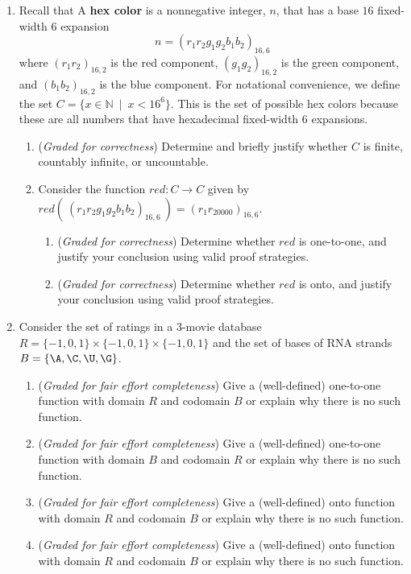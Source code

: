 \begin{enumerate}
   \item Recall that  A {\bf hex color} is a nonnegative
   integer, $n$, that has a base $16$ fixed-width $6$ expansion
   $$n = (r_1r_2g_1g_2b_1b_2)_{16,6}$$ 
   where $(r_1r_2)_{16,2}$ is the red
   component, $(g_1g_2)_{16,2}$ is the green component, and $(b_1b_2)_{16,2}$ is the
   blue component.   For notational convenience, we define the set 
   $C = \{ x \in \mathbb{N} ~\mid~x  < 16^6 \}$.  This is the set of possible hex colors because these
   are all numbers that have hexadecimal fixed-width $6$ expansions. 
   \begin{enumerate}
    \item ({\it Graded for correctness}) Determine and briefly justify whether $C$ is finite, countably infinite, or uncountable.
    \item Consider the function $red: C \to C$ given by $red(~(r_1r_2g_1g_2b_1b_2)_{16,6}~) = (r_1r_20000)_{16,6}$.
        \begin{enumerate}
            \item ({\it Graded for correctness}) Determine whether $red$ is one-to-one, 
            and justify your conclusion using valid proof strategies.
            \item ({\it Graded for correctness}) Determine whether $red$ is onto, 
            and justify your conclusion using valid proof strategies.
        \end{enumerate}
   \end{enumerate}

    \item Consider the set of ratings in a 3-movie database 
    $R = \{ -1,0,1\} \times \{-1,0,1\} \times \{-1,0,1\}$ and the set of 
    bases of RNA strands $B = \{\A, \C, \U, \G\}$.
    \begin{enumerate}
        \item ({\it Graded for fair effort completeness}) Give a (well-defined) one-to-one function with domain $R$ and codomain $B$ or explain why there is no such function.
        \item ({\it Graded for fair effort completeness}) Give a (well-defined) one-to-one function with domain $B$ and codomain $R$ or explain why there is no such function.
        \item ({\it Graded for fair effort completeness}) Give a (well-defined) onto function with domain $R$ and codomain $B$ or explain why there is no such function.
        \item ({\it Graded for fair effort completeness}) Give a (well-defined) onto function with domain $R$ and codomain $B$ or explain why there is no such function.
    \end{enumerate}


\end{enumerate}
